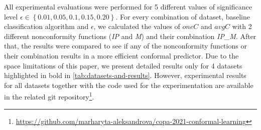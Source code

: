 All experimental evaluations were performed for 5 different values of significance
level $\epsilon \in \left\{ 0.01, 0.05, 0.1, 0.15, 0.20 \right\}$. For every 
combination of dataset, baseline classification algorithm and $\epsilon$, we 
calculated the values of $oneC$ and $avgC$ with 2 different nonconformity 
functions (\textit{IP} and \textit{M}) and their combination \textit{IP\_M}.
After that, the results were compared to see if any of the nonconformity 
functions or their combination 
results in a more efficient conformal predictor. 
Due to the space limitations of this paper, we present 
detailed results only for 4 datasets highlighted in bold in \cref{tab:datasets-and-results}. 
However, experimental results for all datasets together with the 
code used for the experimentation
are available in the related git repository\footnote{
\url{https://github.com/marharyta-aleksandrova/copa-2021-conformal-learning}
}.


